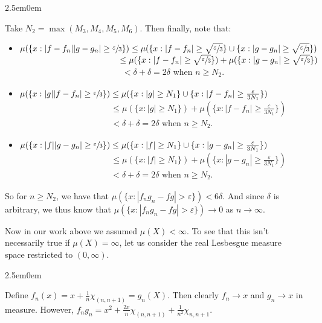 \documentclass{book}
\newcommand{\exPP}{%
   \color{RedViolet}%
   \fontsize{12}{14}\selectfont%
}
\newenvironment{myIndent}{%
   \begin{adjustwidth}{2.5em}{0em}%
}{%
   \end{adjustwidth}%
}
\newcommand{\retTwo}{\hfill\bigbreak}
\begin{document}
\begin{enumerate}
\begin{myIndent}
		Take $N_2 = \max(M_3, M_4, M_5, M_6)$. Then finally, note that:
		{\begin{itemize}\exPP
			\item $\mu(\{x : |f - f_n||g - g_n| \geq \sfrac{\varepsilon}{3}\}) \leq \mu(\{x : |f - f_n| \geq \sqrt{\sfrac{\varepsilon}{3}}\} \cup \{x : |g - g_n| \geq \sqrt{\sfrac{\varepsilon}{3}}\})$\\ [3pt]
			$\phantom{\mu(\{x : |f - f_n||g - g_n| \geq\})} \leq \mu(\{x : |f - f_n| \geq \sqrt{\sfrac{\varepsilon}{3}}\}) + \mu (\{x : |g - g_n| \geq \sqrt{\sfrac{\varepsilon}{3}}\})$\\ [3pt]
			$\phantom{\mu(\{x : |f - f_n||g - g_n| \geq\})} < \delta + \delta = 2\delta$ when $n \geq N_2$.\retTwo

			\item $\mu(\{x : |g||f - f_n| \geq \sfrac{\varepsilon}{3}\}) \leq \mu(\{x : |g| \geq N_1\} \cup \{x : |f - f_n| \geq \frac{\varepsilon}{3N_1}\})$\\ [3pt]
			$\phantom{\mu(\{x : |f - f_n||g - g_n| \})} \leq \mu(\{x : |g| \geq N_1 \}) + \mu (\{x : |f - f_n| \geq \frac{\varepsilon}{3N_1}\})$\\ [3pt]
			$\phantom{\mu(\{x : |f - f_n||g - g_n|\})} < \delta + \delta = 2\delta$ when $n \geq N_2$.\newpage

			\item $\mu(\{x : |f||g - g_n| \geq \sfrac{\varepsilon}{3}\}) \leq \mu(\{x : |f| \geq N_1\} \cup \{x : |g - g_n| \geq \frac{\varepsilon}{3N_1}\})$\\ [3pt]
			$\phantom{\mu(\{x : |f - f_n||g - g_n| \})} \leq \mu(\{x : |f| \geq N_1 \}) + \mu (\{x : |g - g_n| \geq \frac{\varepsilon}{3N_1}\})$\\ [3pt]
			$\phantom{\mu(\{x : |f - f_n||g - g_n|\})} < \delta + \delta = 2\delta$ when $n \geq N_2$.\retTwo
		\end{itemize}}

		So for $n \geq N_2$, we have that $\mu(\{x : |f_ng_n - fg| > \varepsilon\}) < 6\delta$. And since $\delta$ is arbitrary, we thus know that $\mu(\{x : |f_ng_n - fg| > \varepsilon\})\rightarrow 0$ as $n \rightarrow \infty$.\retTwo\retTwo


		Now in our work above we assumed $\mu(X) < \infty$. To see that this isn't\\ necessarily true if $\mu(X) = \infty$, let us consider the real Lesbesgue measure\\ space restricted to $(0, \infty)$.

		\begin{myIndent}
			Define $f_n(x) = x + \frac{1}{n}\chi_{(n, n+1)} = g_n(X)$. Then clearly $f_n \rightarrow x$ and $g_n \rightarrow x$ in measure. However, $f_ng_n = x^2 + \frac{2x}{n}\chi_{(n, n+1)} + \frac{1}{n^2}\chi_{n, n+1}$.\retTwo
			

\end{myIndent}
\end{myIndent}
\end{enumerate}
\end{document}
